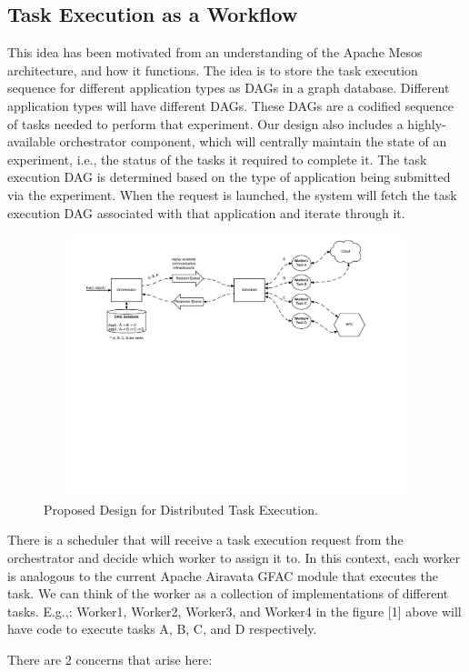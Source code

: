 \documentclass[sigconf]{acmart}
\begin{document}
\subsection{Task Execution as a Workflow}
This idea has been motivated from an understanding of the Apache Mesos \cite{apacheMesos} architecture, and how it functions. The idea is to store the task execution sequence for different application types as DAGs in a graph database. Different application types will have different DAGs. These DAGs are a codified sequence of tasks needed to perform that experiment.  Our design also includes a highly-available orchestrator component, which will centrally maintain the state of an experiment, i.e., the status of the tasks it required to complete it. The task execution DAG is determined based on the type of application being submitted via the experiment.  When the request is launched, the system will fetch the task execution DAG associated with that application and iterate through it.

\begin{figure}
\includegraphics[height=3in, width=7in]{figures/overall-design.pdf}
\caption{Proposed Design for Distributed Task Execution.}
\end{figure}

There is a scheduler that will receive a task execution request from the orchestrator and decide which worker to assign it to. In this context, each worker  is analogous to the current Apache Airavata GFAC module that executes the task. We can think of the worker as a collection of implementations of different tasks. E.g.,: Worker1, Worker2, Worker3, and Worker4 in the figure [1] above will have code to execute tasks A, B, C, and D respectively.

There are 2 concerns that arise here:
\end{document}
